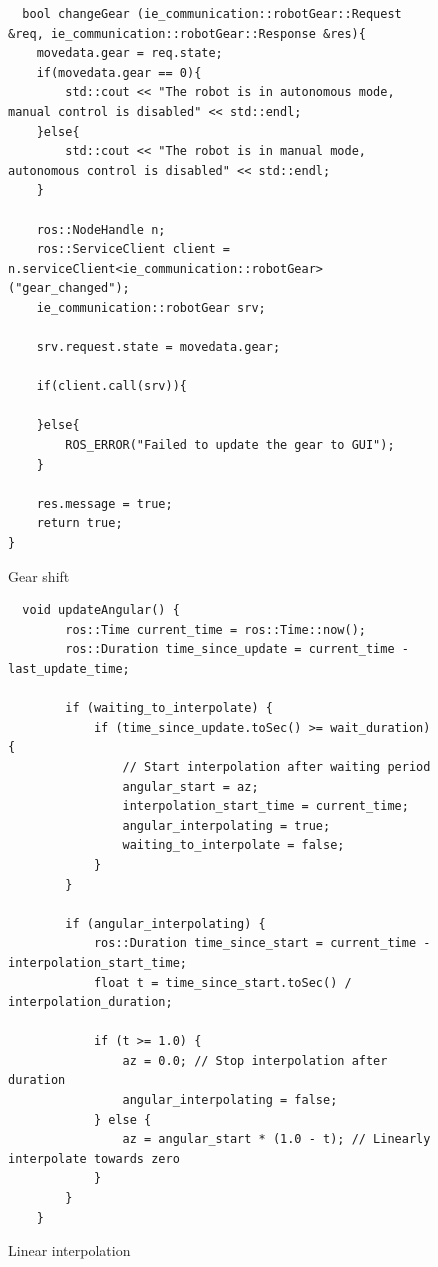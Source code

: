 \documentclass[a4paper,12pt]{extreport}
\begin{document}
\begin{figure}
  \begin{verbatim}
  bool changeGear (ie_communication::robotGear::Request &req, ie_communication::robotGear::Response &res){
    movedata.gear = req.state;
    if(movedata.gear == 0){
        std::cout << "The robot is in autonomous mode, manual control is disabled" << std::endl;
    }else{
        std::cout << "The robot is in manual mode, autonomous control is disabled" << std::endl;
    }

    ros::NodeHandle n;
    ros::ServiceClient client = n.serviceClient<ie_communication::robotGear>("gear_changed");
    ie_communication::robotGear srv;

    srv.request.state = movedata.gear;

    if(client.call(srv)){

    }else{
        ROS_ERROR("Failed to update the gear to GUI");
    }

    res.message = true;
    return true;
}
\end{verbatim}
\caption{Gear shift}
\end{figure}

\begin{figure}
  \begin{verbatim}
  void updateAngular() {
        ros::Time current_time = ros::Time::now();
        ros::Duration time_since_update = current_time - last_update_time;

        if (waiting_to_interpolate) {
            if (time_since_update.toSec() >= wait_duration) {
                // Start interpolation after waiting period
                angular_start = az;
                interpolation_start_time = current_time;
                angular_interpolating = true;
                waiting_to_interpolate = false;
            }
        }

        if (angular_interpolating) {
            ros::Duration time_since_start = current_time - interpolation_start_time;
            float t = time_since_start.toSec() / interpolation_duration;

            if (t >= 1.0) {
                az = 0.0; // Stop interpolation after duration
                angular_interpolating = false;
            } else {
                az = angular_start * (1.0 - t); // Linearly interpolate towards zero
            }
        }
    }

\end{verbatim}
\caption{Linear interpolation}
\end{figure}
\end{document}
